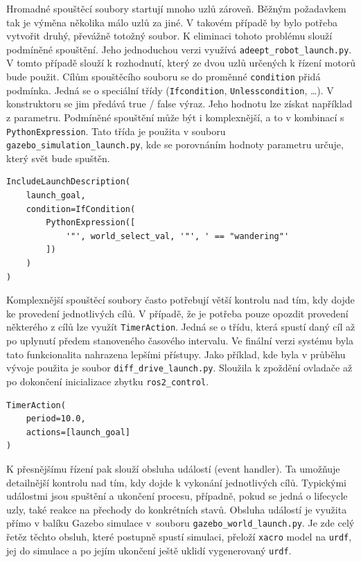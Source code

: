 Hromadné spouštěcí soubory startují mnoho uzlů zároveň. Běžným požadavkem tak je výměna několika málo uzlů za jiné. V takovém případě by bylo potřeba vytvořit druhý, převážně totožný soubor. K eliminaci tohoto problému slouží podmíněné spouštění. Jeho jednoduchou verzi využívá \verb|adeept_robot_launch.py|. V tomto případě slouží k rozhodnutí, který ze dvou uzlů určených k řízení motorů bude použit. Cílům spouštěcího souboru se do proměnné \verb|condition| přidá podmínka. Jedná se o speciální třídy (\verb|Ifcondition|, \verb|Unlesscondition|, \dots). V konstruktoru se jim předává true / false výraz. Jeho hodnotu lze získat například z parametru. Podmíněné spouštění může být i komplexnější, a to v kombinací s \verb|PythonExpression|. Tato třída je použita v souboru \verb|gazebo_simulation_launch.py|, kde se porovnáním hodnoty parametru určuje, který svět bude spuštěn.
\begin{verbatim}
IncludeLaunchDescription(
    launch_goal,
    condition=IfCondition(
        PythonExpression([
            '"', world_select_val, '"', ' == "wandering"'
        ])
    )
)
\end{verbatim}

Komplexnější spouštěcí soubory často potřebují větší kontrolu nad tím, kdy dojde ke provedení jednotlivých cílů. V případě, že je potřeba pouze opozdit provedení některého z cílů lze využít \verb|TimerAction|. Jedná se o třídu, která spustí daný cíl až po uplynutí předem stanoveného časového intervalu. Ve finální verzi systému byla tato funkcionalita nahrazena lepšími přístupy. Jako příklad, kde byla v průběhu vývoje použita je soubor \verb|diff_drive_launch.py|. Sloužila k zpoždění  ovladače až po dokončení inicializace zbytku \verb|ros2_control|.
\begin{verbatim}
TimerAction(
    period=10.0,
    actions=[launch_goal]
)
\end{verbatim}

K přesnějšímu řízení pak slouží obsluha událostí (event handler). Ta umožňuje detailnější kontrolu nad tím, kdy dojde k vykonání jednotlivých cílů. Typickými událostmi jsou spuštění a ukončení procesu, případně, pokud se jedná o lifecycle uzly, také reakce na přechody do konkrétních stavů. Obsluha událostí je využita přímo v balíku Gazebo simulace v~souboru \verb|gazebo_world_launch.py|. Je zde celý řetěz těchto obsluh, které postupně spustí simulaci, přeloží \verb|xacro| model na \verb|urdf|,  jej do simulace a po jejím ukončení ještě uklidí vygenerovaný \verb|urdf|.

